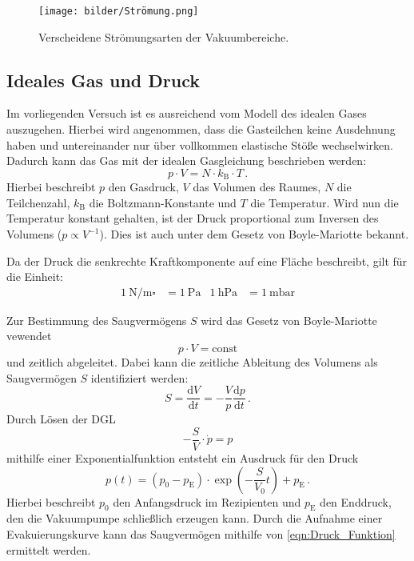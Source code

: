         \begin{figure}
            \centering
            \texttt{[image: bilder/Strömung.png]}
            \caption{Verscheidene Strömungsarten der Vakuumbereiche.\cite{Pfeiffer}}
            \label{fig:Strömung}
        \end{figure}

    \subsection{Ideales Gas und Druck}
        Im vorliegenden Versuch ist es ausreichend vom Modell des idealen Gases auszugehen.
        Hierbei wird angenommen, dass die Gasteilchen keine Ausdehnung haben und untereinander nur über vollkommen elastische Stöße wechselwirken.
        Dadurch kann das Gas mit der idealen Gasgleichung beschrieben werden:
        \begin{equation*}
            p \cdot V = N \cdot k_\text{B} \cdot T \, .
        \end{equation*}
        Hierbei beschreibt $p$ den Gasdruck, $V$ das Volumen des Raumes, $N$ die Teilchenzahl, $k_\text{B}$ die Boltzmann-Konstante und $T$ die Temperatur.
        Wird nun die Temperatur konstant gehalten, ist der Druck proportional zum Inversen des Volumens ($p \propto V^{-1}$).
        Dies ist auch unter dem Gesetz von Boyle-Mariotte bekannt.

        \noindent
        Da der Druck die senkrechte Kraftkomponente auf eine Fläche beschreibt, gilt für die Einheit:
        \begin{align*}
            \SI{1}{\newton\per\metre\square} &= \SI{1}{\pascal}& \SI{1}{\hecto\pascal} &= \SI{1}{\milli\bar} 
        \end{align*}

        \noindent
        Zur Bestimmung des Saugvermögens $S$ wird das Gesetz von Boyle-Mariotte vewendet
        \begin{equation*}
            p \cdot V = \text{const}
        \end{equation*}
        und zeitlich abgeleitet.
        Dabei kann die zeitliche Ableitung des Volumens als Saugvermögen $S$ identifiziert werden:
        \begin{equation*}
            S = \frac{\text{d}V}{\text{d}t} = - \frac{V}{p} \frac{\text{d}p}{\text{d}t} \, .
        \end{equation*}
        Durch Lösen der DGL
        \begin{equation}
            - \frac{S}{V} \cdot \dot{p} = p
            \label{eqn:saug_eva_theo}
        \end{equation}
        mithilfe einer Exponentialfunktion entsteht ein Ausdruck für den Druck
        \begin{equation}
            p(t) = (p_0 - p_\text{E}) \cdot \exp{(- \frac{S}{V_0}t)} +p_\text{E} \, .
            \label{eqn:Druck_Funktion}
        \end{equation}
        Hierbei beschreibt $p_0$ den Anfangsdruck im Rezipienten und $p_\text{E}$ den Enddruck, den die Vakuumpumpe schließlich erzeugen kann.
        Durch die Aufnahme einer Evakuierungskurve kann das Saugvermögen mithilfe von \eqref{eqn:Druck_Funktion} ermittelt werden.

